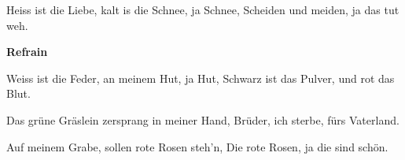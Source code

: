\footnotemark [
ititle={Rote Husaren}]


\beginverse
Heiss ist die Liebe, kalt is die Schnee, ja Schnee,
Scheiden und meiden, ja das tut weh.
\endverse

\beginchorus
\textbf{Refrain}
\endchorus

\beginverse
Weiss ist die Feder, an meinem Hut, ja Hut,
Schwarz ist das Pulver, und rot das Blut.
\endverse

\beginverse
Das grüne Gräslein zersprang in meiner Hand,
Brüder, ich sterbe, fürs Vaterland.
\endverse

\beginverse
Auf meinem Grabe, sollen rote Rosen steh'n,
Die rote Rosen, ja die sind schön.
\endverse
\endsong